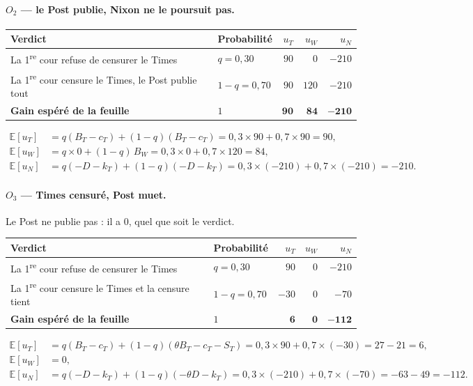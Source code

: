 \documentclass[11pt,a4paper]{article}
\theoremstyle{definition}
\newcommand{\E}{\mathbb{E}}
\begin{document}
\paragraph{$O_2$ — le Post publie, Nixon ne le poursuit pas.}
\begin{center}
\footnotesize
\begin{tabularx}{\textwidth}{@{}>{\raggedright\arraybackslash}Xlrrr@{}}
\toprule
Verdict & Probabilité & $u_T$ & $u_W$ & $u_N$ \\
\midrule
La 1\textsuperscript{re} cour refuse de censurer le Times & $q=0,30$ & $90$ & $0$ & $-210$ \\
La 1\textsuperscript{re} cour censure le Times, le Post publie tout & $1-q=0,70$ & $90$ & $120$ & $-210$ \\
\midrule
\textbf{Gain espéré de la feuille} & $1$ & $\mathbf{90}$ & $\mathbf{84}$ & $\mathbf{-210}$ \\
\bottomrule
\end{tabularx}
\end{center}
\begin{align*}
\E[u_T] &= q(B_T-c_T)+(1-q)(B_T-c_T) = 0,3\times90+0,7\times90 = 90,\\
\E[u_W] &= q\times0+(1-q)\,B_W = 0,3\times0+0,7\times120 = 84,\\
\E[u_N] &= q(-D-k_T)+(1-q)(-D-k_T) = 0,3\times(-210)+0,7\times(-210) = -210.
\end{align*}

\paragraph{$O_3$ — Times censuré, Post muet.} Le Post ne publie pas : il a $0$, quel que soit le verdict.
\begin{center}
\footnotesize
\begin{tabularx}{\textwidth}{@{}>{\raggedright\arraybackslash}Xlrrr@{}}
\toprule
Verdict & Probabilité & $u_T$ & $u_W$ & $u_N$ \\
\midrule
La 1\textsuperscript{re} cour refuse de censurer le Times & $q=0,30$ & $90$ & $0$ & $-210$ \\
La 1\textsuperscript{re} cour censure le Times et la censure tient & $1-q=0,70$ & $-30$ & $0$ & $-70$ \\
\midrule
\textbf{Gain espéré de la feuille} & $1$ & $\mathbf{6}$ & $\mathbf{0}$ & $\mathbf{-112}$ \\
\bottomrule
\end{tabularx}
\end{center}
\begin{align*}
\E[u_T] &= q(B_T-c_T)+(1-q)(\theta B_T-c_T-S_T) = 0,3\times90+0,7\times(-30) = 27-21 = 6,\\
\E[u_W] &= 0,\\
\E[u_N] &= q(-D-k_T)+(1-q)(-\theta D-k_T) = 0,3\times(-210)+0,7\times(-70) = -63-49 = -112.
\end{align*}
\end{document}
